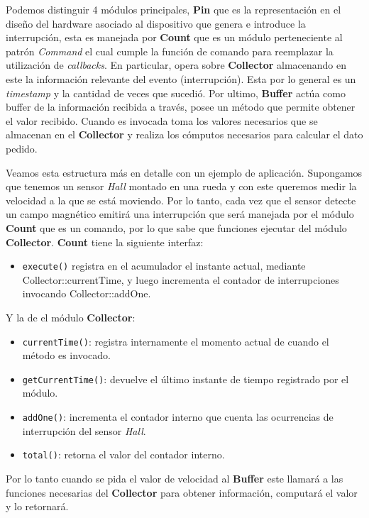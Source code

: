 


Podemos distinguir 4 módulos principales, \textbf{Pin} que es la representación en el diseño del hardware asociado al dispositivo que genera e introduce la interrupción, esta es manejada por \textbf{Count} que es un módulo perteneciente al patrón \textit{Command} el cual cumple la función de comando para reemplazar la utilización de \textit{callbacks}. En particular, opera sobre \textbf{Collector} almacenando en este la información relevante del evento (interrupción). Esta por lo general es un \textit{timestamp} y la cantidad de veces que sucedió.  Por ultimo, \textbf{Buffer} actúa como buffer de la información recibida a través, posee un método que permite obtener el valor recibido. Cuando es invocada toma los valores necesarios que se almacenan en el \textbf{Collector} y realiza los cómputos necesarios para calcular el dato pedido.

Veamos esta estructura más en detalle con un ejemplo de aplicación. Supongamos que tenemos un sensor \textit{Hall} montado en una rueda y con este queremos medir la velocidad a la que se está moviendo. Por lo tanto, cada vez que el sensor detecte un campo magnético emitirá una interrupción que será manejada por el módulo \textbf{Count} que es un comando, por lo que sabe que funciones ejecutar del módulo \textbf{Collector}. \textbf{Count} tiene la siguiente interfaz:
\begin{itemize}
    \item \verb|execute()| registra en el acumulador el instante actual, mediante Collector::currentTime, y luego incrementa el contador de interrupciones invocando Collector::addOne.
\end{itemize}

Y la de el módulo \textbf{Collector}:
\begin{itemize}
    \item \verb|currentTime()|: registra internamente el momento actual de cuando el método es invocado.
    \item \verb|getCurrentTime()|: devuelve el último instante de tiempo registrado por el módulo.
    \item \verb|addOne()|: incrementa el contador interno que cuenta las ocurrencias de interrupción del sensor \textit{Hall}.
    \item \verb|total()|: retorna el valor del contador interno.
\end{itemize}

Por lo tanto cuando se pida el valor de velocidad al \textbf{Buffer} este llamará a las funciones necesarias del \textbf{Collector} para obtener información, computará el valor y lo retornará.

